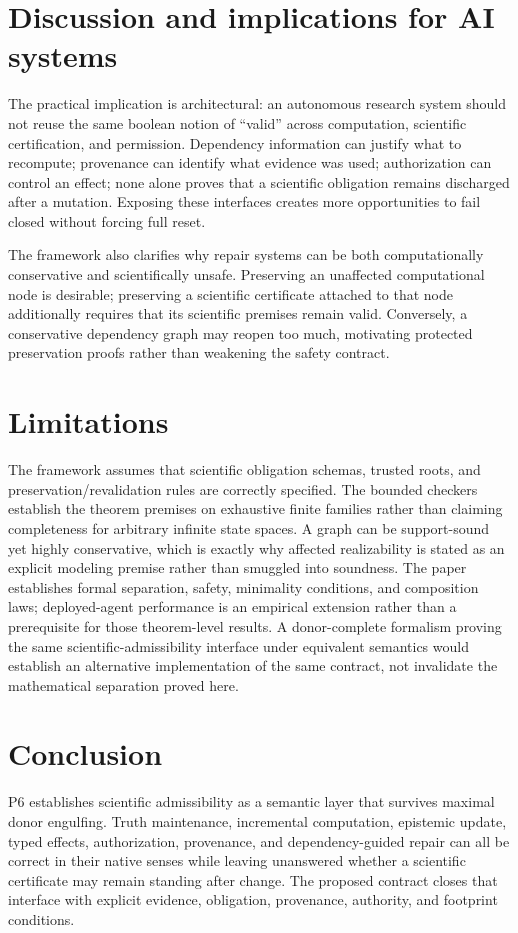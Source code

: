 \documentclass[11pt]{article}
\begin{document}
\section{Discussion and implications for AI systems}
The practical implication is architectural: an autonomous research system should not reuse the same boolean notion of ``valid'' across computation, scientific certification, and permission. Dependency information can justify what to recompute; provenance can identify what evidence was used; authorization can control an effect; none alone proves that a scientific obligation remains discharged after a mutation. Exposing these interfaces creates more opportunities to fail closed without forcing full reset.

The framework also clarifies why repair systems can be both computationally conservative and scientifically unsafe. Preserving an unaffected computational node is desirable; preserving a scientific certificate attached to that node additionally requires that its scientific premises remain valid. Conversely, a conservative dependency graph may reopen too much, motivating protected preservation proofs rather than weakening the safety contract.

\section{Limitations}
The framework assumes that scientific obligation schemas, trusted roots, and preservation\slash revalidation rules are correctly specified. The bounded checkers establish the theorem premises on exhaustive finite families rather than claiming completeness for arbitrary infinite state spaces. A graph can be support-sound yet highly conservative, which is exactly why affected realizability is stated as an explicit modeling premise rather than smuggled into soundness. The paper establishes formal separation, safety, minimality conditions, and composition laws; deployed-agent performance is an empirical extension rather than a prerequisite for those theorem-level results. A donor-complete formalism proving the same scientific-admissibility interface under equivalent semantics would establish an alternative implementation of the same contract, not invalidate the mathematical separation proved here.

\section{Conclusion}
P6 establishes scientific admissibility as a semantic layer that survives maximal donor engulfing. Truth maintenance, incremental computation, epistemic update, typed effects, authorization, provenance, and dependency-guided repair can all be correct in their native senses while leaving unanswered whether a scientific certificate may remain standing after change. The proposed contract closes that interface with explicit evidence, obligation, provenance, authority, and footprint conditions.
\end{document}
